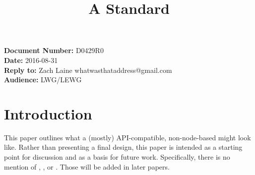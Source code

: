 \documentclass{article}
\begin{document}
\title{\textbf{\Large A Standard }}
\date{}
{\let\newpage\relax\maketitle}

\noindent\textbf{Document Number:} D0429R0\\
\textbf{Date:} 2016-08-31\\
\textbf{Reply to:} Zach Laine whatwasthataddress@gmail.com\\
\textbf{Audience:} LWG/LEWG

\section{Introduction}

\label{sec:intro}

This paper outlines what a (mostly) API-compatible, non-node-based 
might look like.  Rather than presenting a final design, this paper is
intended as a starting point for discussion and as a basis for future work.
Specifically, there is no mention of , , or
.  Those will be added in later papers.



\end{document}
